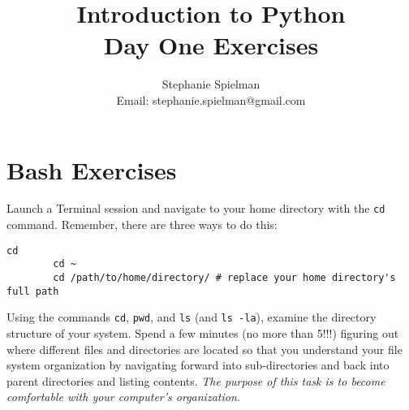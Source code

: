 \documentclass{article}[12pt]
\newcommand{\code}[1]{\texttt{#1}}  %
\begin{document}
\title{Introduction to Python \\ Day One Exercises}
\author{Stephanie Spielman \\ \footnotesize{Email: stephanie.spielman@gmail.com}}
\date{}
\maketitle{}

\section{Bash Exercises}

    Launch a Terminal session and navigate to your home directory with the \code{cd} command. Remember, there are three ways to do this:
        \begin{Verbatim}[fontsize=\small,commandchars=+\[\]]
        cd
        cd ~
        cd /path/to/home/directory/ # replace your home directory's full path
        \end{Verbatim}
        Using the commands \code{cd}, \code{pwd}, and \code{ls} (and \code{ls -la}), examine the directory structure of your system. Spend a few minutes (no more than 5!!!) figuring out where different files and directories are located so that you understand your file system organization by navigating forward into sub-directories and back into parent directories and listing contents. \emph{The purpose of this task is to become comfortable with your computer's organization.}
\end{document}

